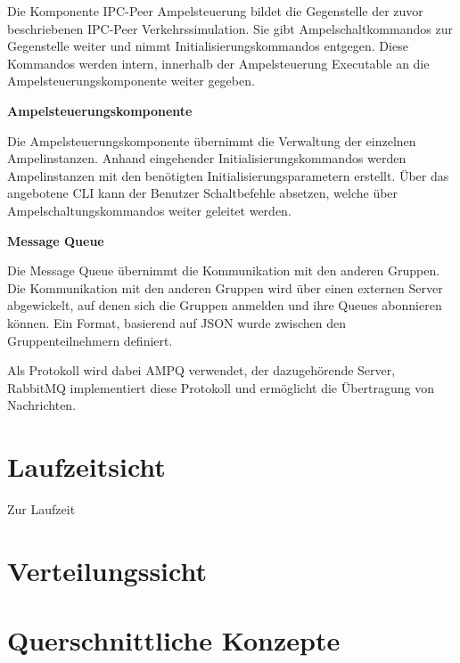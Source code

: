 Die Komponente IPC-Peer Ampelsteuerung bildet die Gegenstelle der zuvor beschriebenen IPC-Peer Verkehrssimulation. Sie gibt Ampelschaltkommandos zur Gegenstelle weiter und nimmt Initialisierungskommandos entgegen. Diese Kommandos werden intern, innerhalb der Ampelsteuerung Executable an die Ampelsteuerungskomponente weiter gegeben.

\begin{flushleft}
\textbf{Ampelsteuerungskomponente}
\end{flushleft}
\vspace{-0.3 cm}

Die Ampelsteuerungskomponente übernimmt die Verwaltung der einzelnen Ampelinstanzen. Anhand eingehender Initialisierungskommandos werden Ampelinstanzen mit den benötigten Initialisierungsparametern erstellt. Über das angebotene CLI kann der Benutzer Schaltbefehle absetzen, welche über Ampelschaltungskommandos weiter geleitet werden.

\begin{flushleft}
\textbf{Message Queue}
\end{flushleft}
\vspace{-0.3 cm}

Die Message Queue übernimmt die Kommunikation mit den anderen Gruppen. Die Kommunikation mit den anderen Gruppen wird über einen externen Server abgewickelt, auf denen sich die Gruppen anmelden und ihre Queues abonnieren können. Ein Format, basierend auf JSON wurde zwischen den Gruppenteilnehmern definiert.

Als Protokoll wird dabei AMPQ verwendet, der dazugehörende Server, RabbitMQ implementiert diese Protokoll und ermöglicht die Übertragung von Nachrichten.

\section{Laufzeitsicht}
\label{Laufzeitsicht}

Zur Laufzeit

\section{Verteilungssicht}
\label{Verteilungssicht}

\section{Querschnittliche Konzepte}
\label{Querschnittliche Konzepte}


